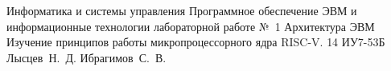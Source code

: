 \documentclass{bmstu}
\begin{document}
\makereporttitle
{Информатика и системы управления} %
{Программное обеспечение ЭВМ и информационные технологии} %
{лабораторной работе №~1} %
{Архитектура ЭВМ} %
{Изучение принципов работы микропроцессорного ядра RISC-V.} %
{14} %
{ИУ7-53Б} %
{Лысцев~Н.~Д.} %
{Ибрагимов~С.~В.} 

\maketableofcontents





% 
\end{document}

